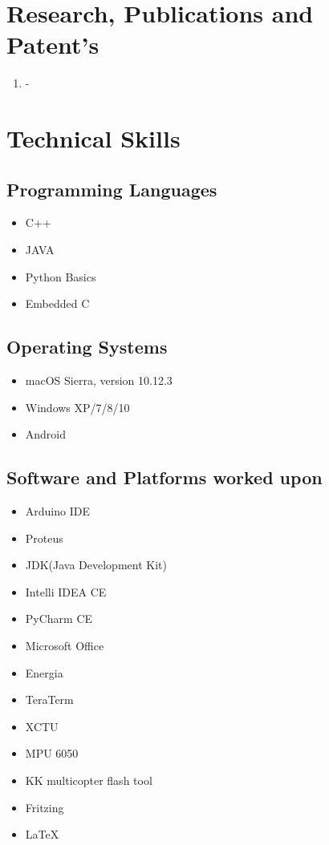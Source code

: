 \documentclass[11pt]{article}
\begin{document}
\begin{minipage}{1.5\linewidth}

\section{\color{blue}Res\color{black}earch, Publications and Patent's}
\begin{enumerate}
\item -
\end{enumerate}

\section{\color{cyan}Tec\color{black}hnical Skills}
\subsection{Programming Languages}
\begin{itemize}
\item C++
\item JAVA
\item Python Basics
\item Embedded C
\end{itemize}

\subsection{Operating Systems}
\begin{itemize}
\item macOS Sierra, version 10.12.3
\item Windows XP/7/8/10
\item Android
\end{itemize}
\subsection{Software and Platforms worked upon}
\begin{itemize}
\item Arduino IDE
\item Proteus
\item JDK(Java Development Kit)
\item Intelli IDEA CE
\item PyCharm CE
\item Microsoft Office
\item Energia
\item TeraTerm
\item XCTU
\item MPU 6050
\item KK multicopter flash tool
\item Fritzing
\item LaTeX
\end{itemize}

\end{minipage}
\end{document}
